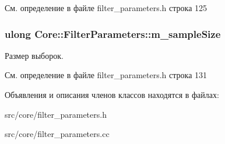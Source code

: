 См. определение в файле filter\+\_\+parameters.\+h строка 125

\subsubsection[{\texorpdfstring{m\+\_\+sample\+Size}{m_sampleSize}}]{\setlength{\rightskip}{0pt plus 5cm}ulong Core\+::\+Filter\+Parameters\+::m\+\_\+sample\+Size\hspace{0.3cm}{\ttfamily [private]}}\hypertarget{class_core_1_1_filter_parameters_a70abc1052c13fe0fb7f971229d7a1316}{}\label{class_core_1_1_filter_parameters_a70abc1052c13fe0fb7f971229d7a1316}
Размер выборок. 

См. определение в файле filter\+\_\+parameters.\+h строка 131



Объявления и описания членов классов находятся в файлах\+:\begin{DoxyCompactItemize}
\item 
src/core/filter\+\_\+parameters.\+h\item 
src/core/filter\+\_\+parameters.\+cc\end{DoxyCompactItemize}
